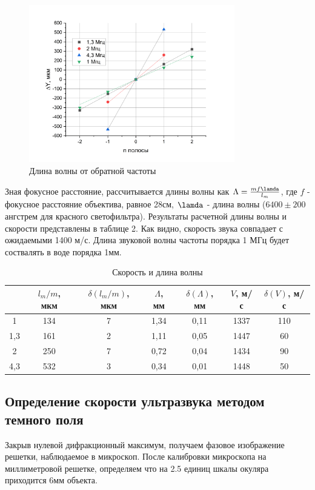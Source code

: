 \documentclass[a4paper, 12pt]{article}
\begin{document}
\begin{figure}[h!]
    \begin{center}
    \includegraphics[width=0.8\textwidth]{lanes.png}
    \end{center}
    \caption{Длина волны от обратной частоты}
\end{figure}
Зная фокусное расстояние, рассчитывается длины волны как $\Lambda=\frac{mf\lamda}{l_{m}}$, где $f$ - фокусное расстояние объектива, равное 28см, $\lamda$ - длина волны ($6400\pm200$ ангстрем для красного светофильтра). Результаты расчетной длины волны и скорости представлены в таблице 2. Как видно, скорость звука совпадает с ожидаемыми 1400 м/с. Длина звуковой волны частоты порядка 1 МГц будет соствалять в воде порядка 1мм. 

\begin{table}[h]
\begin{center}
\caption{Скорость и длина волны}
\begin{tabular}{|c|c|c|c|c|c|c|}
\hline
    & $l_{m}/m$, мкм & $\delta(l_{m}/m)$, мкм & $\Lambda$, мм    & $\delta(\Lambda)$, мм   & $V$, м/с    & $\delta(V)$, м/с  \\ \hline
1   & 134  & 7 & 1,34 & 0,11 & 1337 & 110 \\ \hline
1,3 & 161  & 2 & 1,11 & 0,05 & 1447 & 60  \\ \hline
2   & 250  & 7 & 0,72 & 0,04 & 1434 & 90  \\ \hline
4,3 & 532  & 3 & 0,34 & 0,01 & 1448 & 50  \\ \hline
\end{tabular}
\end{center}
\end{table}
\subsection{Определение скорости ультразвука методом темного поля}
Закрыв нулевой дифракционный максимум, получаем фазовое изображение решетки, наблюдаемое в микроскоп. После калибровки микроскопа на миллиметровой решетке, определяем что на 2.5 единиц шкалы окуляра приходится 6мм объекта. 
\end{document}
